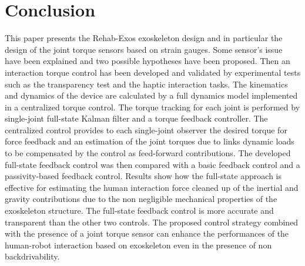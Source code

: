 \section{Conclusion} \label{sec:conclusion}
This paper presents the Rehab-Exos exoskeleton design and in particular the design of the joint torque sensors based on strain gauges. Some sensor's issue have been explained and two possible hypotheses have been proposed. Then an interaction torque control has been developed and validated by experimental tests such as the transparency test and the haptic interaction tasks. The kinematics and dynamics of the device are calculated by a full dynamics model implemented in a centralized torque control. The torque tracking for each joint is performed by single-joint full-state Kalman filter and a torque feedback controller. The centralized control provides to each single-joint observer the desired torque for force feedback and an estimation of the joint torques due to links dynamic loads to be compensated by the control as feed-forward contributions. The developed full-state feedback control was then compared with a basic feedback control and a passivity-based feedback control. Results show how the  full-state approach is effective for estimating the human interaction force cleaned up of the inertial and gravity contributions due to the non negligible mechanical properties of the exoskeleton structure. The full-state feedback control is more accurate and transparent than the other two controls. The proposed control strategy combined with the presence of a joint torque sensor can enhance the performances of the human-robot interaction based on exoskeleton even in the presence of non backdrivability.